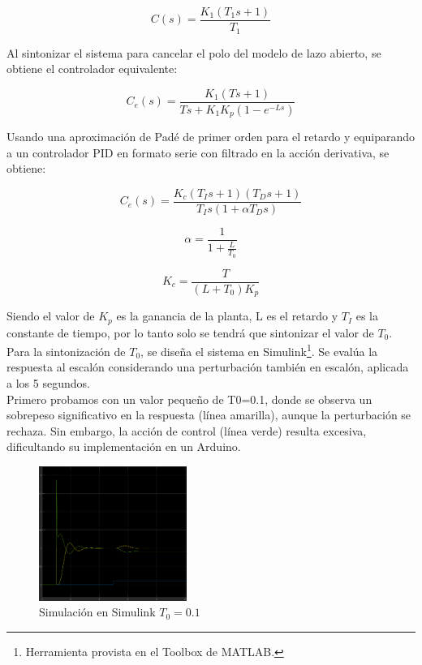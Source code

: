 \documentclass[letterpaper, 10 pt, conference]{ieeeconf}  %
\begin{document}
\begin{equation*}
  C(s) = \frac{K_{1}(T_{1}s+1)}{T_{1}}
\end{equation*}

Al sintonizar el sistema para cancelar el polo del modelo de lazo abierto, se obtiene el controlador equivalente:

\begin{equation*}
  C_{e}(s) = \frac{K_{1}(Ts+1)}{Ts+K_{1}K_{p}(1-e^{-Ls})}
\end{equation*}

Usando una aproximación de Padé de primer orden para el retardo y equiparando a un controlador PID en formato serie con filtrado en la acción derivativa, se obtiene:

\begin{equation*}
  C_{e}(s) = \frac{K_{c}(T_{I}s+1)(T_{D}s+1)}{T_{I}s(1+\alpha T_{D}s)}
\end{equation*}

\begin{equation*}
  \alpha = \frac{1}{1+\frac{L}{T_{0}}}
\end{equation*}

\begin{equation*}
  K_c = \frac{T}{(L+T_{0})K_p}
\end{equation*}

 Siendo el valor de $K_{p}$ es la ganancia de la planta, L es el retardo y $T_{I}$ es la constante de tiempo, por lo tanto solo se tendrá que sintonizar el valor de $T_{0}$. \\
Para la sintonización de $T_0$, se diseña el sistema en Simulink\footnote{Herramienta provista en el Toolbox de MATLAB.}. Se evalúa la respuesta al escalón considerando una perturbación también en escalón, aplicada a los 5 segundos. \\
Primero probamos con un valor pequeño de T0=0.1, donde se observa un sobrepeso significativo en la respuesta (línea amarilla), aunque la perturbación se rechaza. Sin embargo, la acción de control (línea verde) resulta excesiva, dificultando su implementación en un Arduino.\\

\begin{figure}[htpb]
  \centering
  \includegraphics[width=0.43\textwidth]{./IMAGENES/pid1.png}
  \caption{Simulación en Simulink \(T_{0} = 0.1\)}
  \label{fig:pid1}
\end{figure}
\end{document}
